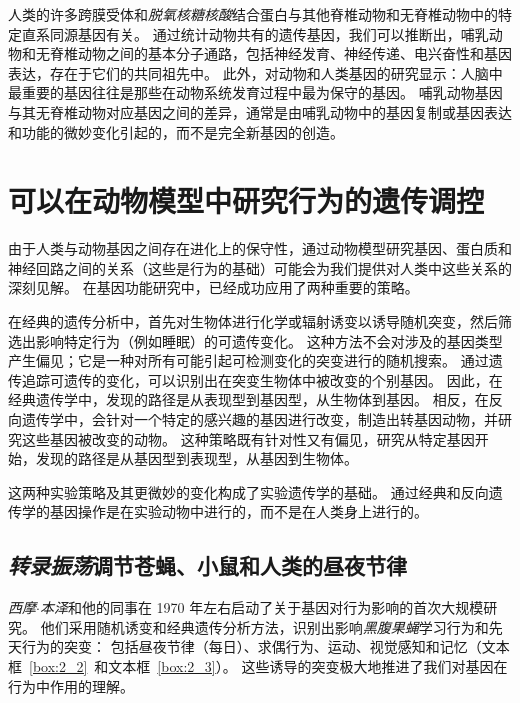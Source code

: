 人类的许多跨膜受体和\textit{脱氧核糖核酸}结合蛋白与其他脊椎动物和无脊椎动物中的特定直系同源基因有关。
通过统计动物共有的遗传基因，我们可以推断出，哺乳动物和无脊椎动物之间的基本分子通路，包括神经发育、神经传递、电兴奋性和基因表达，存在于它们的共同祖先中。
此外，对动物和人类基因的研究显示：人脑中最重要的基因往往是那些在动物系统发育过程中最为保守的基因。
哺乳动物基因与其无脊椎动物对应基因之间的差异，通常是由哺乳动物中的基因复制或基因表达和功能的微妙变化引起的，而不是完全新基因的创造。



\section{可以在动物模型中研究行为的遗传调控}

由于人类与动物基因之间存在进化上的保守性，通过动物模型研究基因、蛋白质和神经回路之间的关系（这些是行为的基础）可能会为我们提供对人类中这些关系的深刻见解。
在基因功能研究中，已经成功应用了两种重要的策略。


在经典的遗传分析中，首先对生物体进行化学或辐射诱变以诱导随机突变，然后筛选出影响特定行为（例如睡眠）的可遗传变化。
这种方法不会对涉及的基因类型产生偏见；它是一种对所有可能引起可检测变化的突变进行的随机搜索。 
通过遗传追踪可遗传的变化，可以识别出在突变生物体中被改变的个别基因。
因此，在经典遗传学中，发现的路径是从表现型到基因型，从生物体到基因。
相反，在反向遗传学中，会针对一个特定的感兴趣的基因进行改变，制造出转基因动物，并研究这些基因被改变的动物。
这种策略既有针对性又有偏见，研究从特定基因开始，发现的路径是从基因型到表现型，从基因到生物体。

这两种实验策略及其更微妙的变化构成了实验遗传学的基础。
通过经典和反向遗传学的基因操作是在实验动物中进行的，而不是在人类身上进行的。



\subsection{\textit{转录振荡}调节苍蝇、小鼠和人类的昼夜节律}

\textit{西摩$\cdot$本泽}和他的同事在 1970 年左右启动了关于基因对行为影响的首次大规模研究。
他们采用随机诱变和经典遗传分析方法，识别出影响\textit{黑腹果蝇}学习行为和先天行为的突变：
包括昼夜节律（每日）、求偶行为、运动、视觉感知和记忆（文本框~\ref{box:2_2}~和文本框~\ref{box:2_3}）。
这些诱导的突变极大地推进了我们对基因在行为中作用的理解。



